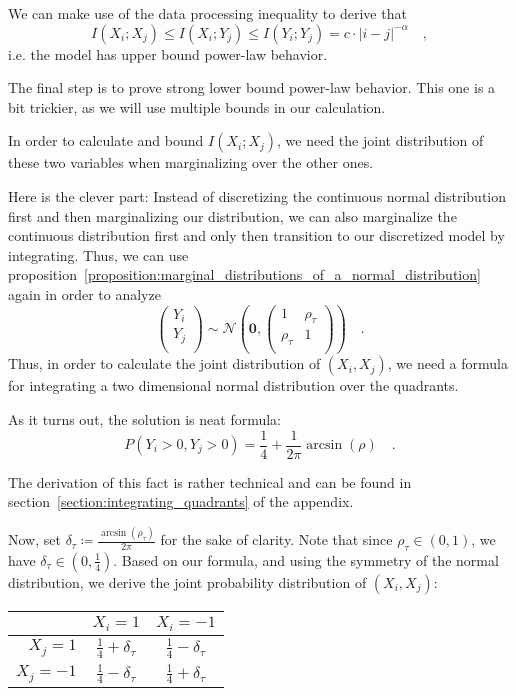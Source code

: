 \documentclass[../../main.tex]{subfiles}
\begin{document}
We can make use of the data processing inequality to derive that
\[
    I(X_i; X_j) \leq I(X_i; Y_j) \leq I(Y_i; Y_j) = c \cdot |i - j|^{-\alpha}\quad ,
\]
i.e. the model has upper bound power-law behavior.

\bigskip
The final step is to prove strong lower bound power-law behavior. This one is a bit trickier, as we will use multiple bounds in our calculation.
\bigskip

 In order to calculate and bound $I(X_i; X_j)$, we need the joint distribution of these two variables when marginalizing over the other ones.

Here is the clever part: Instead of discretizing the continuous normal distribution first and then marginalizing our distribution, we can also marginalize the continuous distribution first and only then transition to our discretized model by integrating. Thus, we can use proposition~\ref{proposition:marginal_distributions_of_a_normal_distribution} again in order to analyze
\[
    \begin{pmatrix*}
        Y_i \\
        Y_j \\
    \end{pmatrix*}
    \sim \mathcal{N}\left(\bm{0}, \begin{pmatrix*}
        1 & \rho_\tau \\
        \rho_\tau & 1 \\
    \end{pmatrix*}\right)
    \quad .
\]
Thus, in order to calculate the joint distribution of $(X_i, X_j)$, we need a formula for integrating a two dimensional normal distribution over the quadrants.

As it turns out, the solution is neat formula:
\[
    P(Y_i>0, Y_j>0) = \frac{1}{4} + \frac{1}{2\pi}\arcsin(\rho) \quad .
\]

The derivation of this fact is rather technical and can be found in section~\ref{section:integrating_quadrants} of the appendix.

Now, set $\delta_\tau \coloneqq \frac{\arcsin(\rho_\tau)}{2\pi}$ for the sake of clarity. Note that since $\rho_\tau \in (0, 1)$, we have $\delta_\tau \in (0, \frac{1}{4})$. Based on our formula, and using the symmetry of the normal distribution, we derive the joint probability distribution of $(X_i, X_j)$:
\begin{table}[h]
    \centering
    \begin{tabular}{r|c|c}
        & $X_i = 1$ & $X_i = -1$ \\
        \hline
        \rule{0pt}{15pt} $X_j = 1$ & $\frac{1}{4} + \delta_\tau$ & $\frac{1}{4} - \delta_\tau$ \\
        \rule{0pt}{15pt} $X_j = -1$ & $\frac{1}{4} - \delta_\tau$ & $\frac{1}{4} + \delta_\tau$
    \end{tabular}
\end{table}
\end{document}
